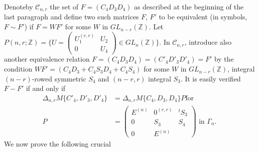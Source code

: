 Denote\pageoriginale by $\mathscr{C}_{n,r}$ the set of
$F=(C_{4}D_{3}D_{4})$ as described at the beginning of the last
paragraph and define two such matrices $F$, $F'$ to be equivalent (in
symbols, $F \sim F'$) if $F=WF'$ for some $W$ in
$GL_{n-r}(\mathbb{Z})$. Let
$P(n,r;\mathbb{Z})=\{U=\left(\begin{smallmatrix} U^{(r,r)}_{1} &
  U_{2}\\ 0 & U_{4}\end{smallmatrix}\right)\in
GL_{n}(\mathbb{Z})\}$. In $\mathscr{C}_{n,r}$, introduce also another
equivalence relation $F=(C_{4}D_{3}D_{4})=(C'_{4}D'_{3}D'_{4})=F'$ by
the condition $WF'=(C_{4}D_{3}+C_{4}S_{3}D_{4}+C_{4}S_{4})$ for some
$W$ in $GL_{n-r}(\mathbb{Z})$, integral $(n-r)$-rowed symmetric
$S_{4}$ and $(n-r,r)$ integral $S_{3}$. It is easily verified $F-F'$
if and only if 
\begin{align*}
\Delta_{n,r}M\{C'_{4},D'_{3},D'_{4}\}&=\Delta_{n,r}M\{C_{4},D_{3},D_{4}\}P\text{
  \  for \ }\\
P &=
\begin{pmatrix}
E^{(n)} & 0^{(r,r)} & {}^{t}S_{3}\\
0 & S_{3} & S_{4}\\
0 & E^{(n)}
\end{pmatrix}
\text{ \  in \ } \Gamma_{n}.
\end{align*}
We now prove the following crucial

